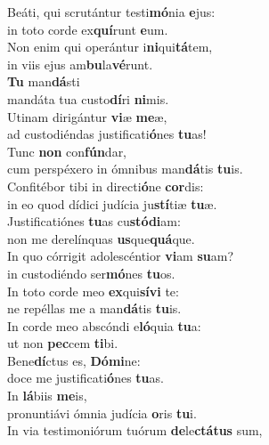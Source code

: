 \evenverse Beáti, qui scrutántur testi\textbf{mó}nia \textbf{e}jus:~\*\\
\evenverse in toto corde ex\textbf{quí}runt \textbf{e}um.\\
\oddverse Non enim qui operántur i\textbf{ni}qui\textbf{tá}tem,~\*\\
\oddverse in viis ejus am\textbf{bu}la\textbf{vé}runt.\\
\evenverse \textbf{Tu} man\textbf{dá}sti~\*\\
\evenverse mandáta tua custo\textbf{dí}ri \textbf{ni}mis.\\
\oddverse Utinam dirigántur \textbf{vi}æ \textbf{me}æ,~\*\\
\oddverse ad custodiéndas justificati\textbf{ó}nes \textbf{tu}as!\\
\evenverse Tunc \textbf{non} con\textbf{fún}dar,~\*\\
\evenverse cum perspéxero in ómnibus man\textbf{dá}tis \textbf{tu}is.\\
\oddverse Confitébor tibi in directi\textbf{ó}ne \textbf{cor}dis:~\*\\
\oddverse in eo quod dídici judícia ju\textbf{stí}tiæ \textbf{tu}æ.\\
\evenverse Justificatiónes \textbf{tu}as cu\textbf{stó}\textbf{di}am:~\*\\
\evenverse non me derelínquas \textbf{us}que\textbf{quá}que.\\
\oddverse In quo córrigit adolescéntior \textbf{vi}am \textbf{su}am?~\*\\
\oddverse in custodiéndo ser\textbf{mó}nes \textbf{tu}os.\\
\evenverse In toto corde meo \textbf{ex}qui\textbf{sí}\textbf{vi} te:~\*\\
\evenverse ne repéllas me a man\textbf{dá}tis \textbf{tu}is.\\
\oddverse In corde meo abscóndi e\textbf{ló}quia \textbf{tu}a:~\*\\
\oddverse ut non \textbf{pec}cem \textbf{ti}bi.\\
\evenverse Bene\textbf{dí}ctus es, \textbf{Dó}\textbf{mi}ne:~\*\\
\evenverse doce me justificati\textbf{ó}nes \textbf{tu}as.\\
\oddverse In \textbf{lá}biis \textbf{me}is,~\*\\
\oddverse pronuntiávi ómnia judícia \textbf{o}ris \textbf{tu}i.\\
\evenverse In via testimoniórum tuórum \textbf{de}le\textbf{ctá}\textbf{tus} sum,~\*\\
